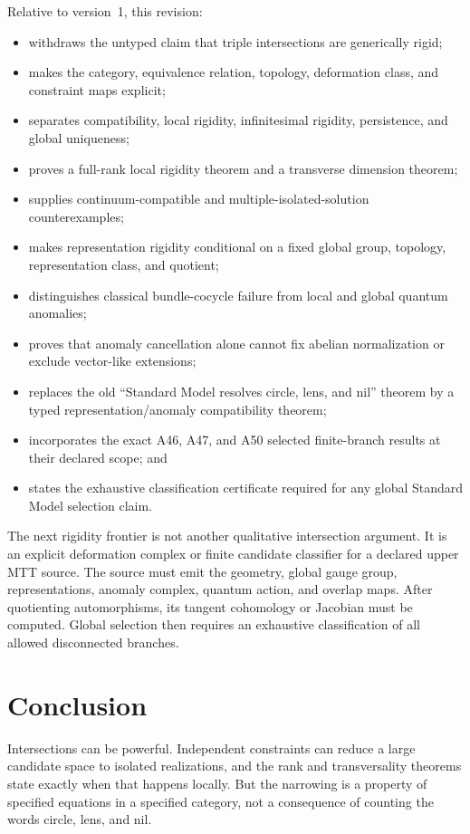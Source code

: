 \documentclass[11pt]{article}
\begin{document}
Relative to version~1, this revision:
\begin{itemize}
\item withdraws the untyped claim that triple intersections are generically
rigid;
\item makes the category, equivalence relation, topology, deformation class,
and constraint maps explicit;
\item separates compatibility, local rigidity, infinitesimal rigidity,
persistence, and global uniqueness;
\item proves a full-rank local rigidity theorem and a transverse dimension
theorem;
\item supplies continuum-compatible and multiple-isolated-solution
counterexamples;
\item makes representation rigidity conditional on a fixed global group,
topology, representation class, and quotient;
\item distinguishes classical bundle-cocycle failure from local and global
quantum anomalies;
\item proves that anomaly cancellation alone cannot fix abelian normalization
or exclude vector-like extensions;
\item replaces the old ``Standard Model resolves circle, lens, and nil''
theorem by a typed representation/anomaly compatibility theorem;
\item incorporates the exact A46, A47, and A50 selected finite-branch results
at their declared scope; and
\item states the exhaustive classification certificate required for any global
Standard Model selection claim.
\end{itemize}

The next rigidity frontier is not another qualitative intersection argument.
It is an explicit deformation complex or finite candidate classifier for a
declared upper MTT source.  The source must emit the geometry, global gauge
group, representations, anomaly complex, quantum action, and overlap maps.
After quotienting automorphisms, its tangent cohomology or Jacobian must be
computed.  Global selection then requires an exhaustive classification of all
allowed disconnected branches.

\section{Conclusion}

Intersections can be powerful.  Independent constraints can reduce a large
candidate space to isolated realizations, and the rank and transversality
theorems state exactly when that happens locally.  But the narrowing is a
property of specified equations in a specified category, not a consequence of
counting the words circle, lens, and nil.
\end{document}
